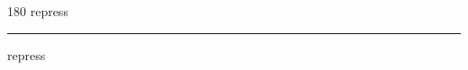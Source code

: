 
\begin{frame}
\begin{center}
\begin{turn}{180}
{\fontsize{2.5cm}{1em}\selectfont repress}
\end{turn}
\vspace{1em}\par  
\hrule
\vspace{1em}\par  
{\fontsize{2.5cm}{1em}\selectfont repress}
\end{center}
\end{frame}
